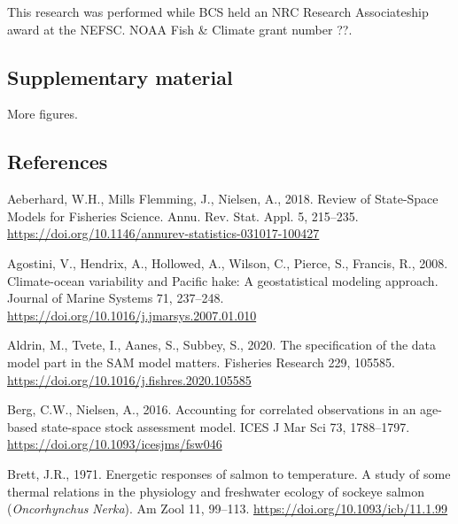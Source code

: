 \documentclass[]{article}
\begin{document}
This research was performed while BCS held an NRC Research Associateship
award at the NEFSC. NOAA Fish \& Climate grant number ??.

\pagebreak

\hypertarget{supplementary-material}{%
\subsection*{Supplementary material}\label{supplementary-material}}

More figures.

\pagebreak

\hypertarget{references}{%
\subsection*{References}\label{references}}

\hypertarget{refs}{}
\leavevmode\hypertarget{ref-aeberhard2018Review}{}%
Aeberhard, W.H., Mills Flemming, J., Nielsen, A., 2018. Review of
State-Space Models for Fisheries Science. Annu. Rev. Stat. Appl. 5,
215--235. \url{https://doi.org/10.1146/annurev-statistics-031017-100427}

\leavevmode\hypertarget{ref-agostini2008Climateocean}{}%
Agostini, V., Hendrix, A., Hollowed, A., Wilson, C., Pierce, S.,
Francis, R., 2008. Climate-ocean variability and Pacific hake: A
geostatistical modeling approach. Journal of Marine Systems 71,
237--248. \url{https://doi.org/10.1016/j.jmarsys.2007.01.010}

\leavevmode\hypertarget{ref-aldrin2020Specification}{}%
Aldrin, M., Tvete, I., Aanes, S., Subbey, S., 2020. The specification of
the data model part in the SAM model matters. Fisheries Research 229,
105585. \url{https://doi.org/10.1016/j.fishres.2020.105585}

\leavevmode\hypertarget{ref-berg2016Accounting}{}%
Berg, C.W., Nielsen, A., 2016. Accounting for correlated observations in
an age-based state-space stock assessment model. ICES J Mar Sci 73,
1788--1797. \url{https://doi.org/10.1093/icesjms/fsw046}

\leavevmode\hypertarget{ref-brett1971Energetic}{}%
Brett, J.R., 1971. Energetic responses of salmon to temperature. A study
of some thermal relations in the physiology and freshwater ecology of
sockeye salmon (\emph{Oncorhynchus} \emph{Nerka}). Am Zool 11, 99--113.
\url{https://doi.org/10.1093/icb/11.1.99}
\end{document}
